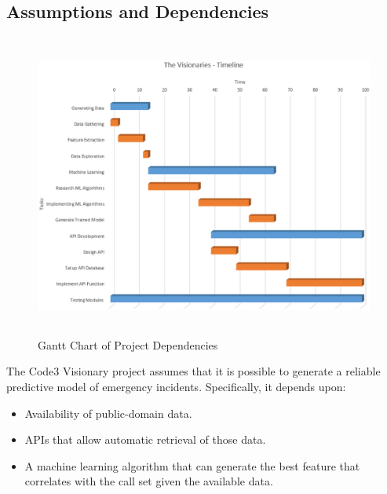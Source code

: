 \documentclass[onecolumn, draftclsnofoot,10pt, compsoc]{IEEEtran}
\begin{document}
    \subsection{Assumptions and Dependencies}
    \begin{figure}[h!]
        \centering
        \includegraphics[height=10cm, width=17cm]{Timeline.eps}
        \caption{Gantt Chart of Project Dependencies}
        \label{fig:timeline}
    \end{figure}
    The Code3 Visionary project assumes that it is possible to generate a reliable predictive model of emergency incidents. Specifically, it depends upon:
    
    \begin{itemize}
    \item Availability of public-domain data.
    \item APIs that allow automatic retrieval of those data.
    \item A machine learning algorithm that can generate the best feature that correlates with the call set given the available data.
    \end{itemize}
    
\end{document}
